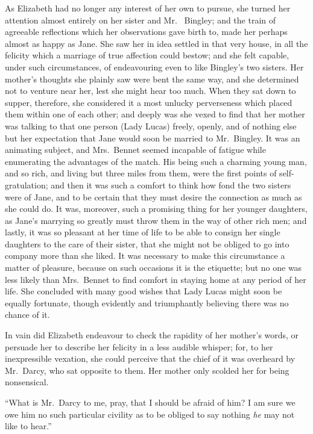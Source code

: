 As Elizabeth had no longer any interest of her own to pursue,
she turned her attention almost entirely on her sister and Mr.\ %
Bingley; and the train of agreeable reflections which her
observations gave birth to, made her perhaps almost as happy as
Jane.  She saw her in idea settled in that very house, in all the
felicity which a marriage of true affection could bestow; and she
felt capable, under such circumstances, of endeavouring even to
like Bingley's two sisters.  Her mother's thoughts she plainly
saw were bent the same way, and she determined not to venture
near her, lest she might hear too much.  When they sat down to
supper, therefore, she considered it a most unlucky perverseness
which placed them within one of each other; and deeply was she
vexed to find that her mother was talking to that one person
(Lady Lucas) freely, openly, and of nothing else but her
expectation that Jane would soon be married to Mr.\ Bingley.  It
was an animating subject, and Mrs.\ Bennet seemed incapable of
fatigue while enumerating the advantages of the match.  His
being such a charming young man, and so rich, and living but
three miles from them, were the first points of self-gratulation;
and then it was such a comfort to think how fond the two sisters
were of Jane, and to be certain that they must desire the
connection as much as she could do.  It was, moreover, such a
promising thing for her younger daughters, as Jane's marrying so
greatly must throw them in the way of other rich men; and lastly,
it was so pleasant at her time of life to be able to consign her
single daughters to the care of their sister, that she might not
be obliged to go into company more than she liked.  It was
necessary to make this circumstance a matter of pleasure,
because on such occasions it is the etiquette; but no one was less
likely than Mrs.\ Bennet to find comfort in staying home at any
period of her life.  She concluded with many good wishes that
Lady Lucas might soon be equally fortunate,  though evidently
and triumphantly believing there was no chance of it.

In vain did Elizabeth endeavour to check the rapidity of her
mother's words, or persuade her to describe her felicity in a
less audible whisper; for, to her inexpressible vexation, she
could perceive that the chief of it was overheard by Mr.\ Darcy,
who sat opposite to them.  Her mother only scolded her for
being nonsensical.

``What is Mr.\ Darcy to me, pray, that I should be afraid of him?
I am sure we owe him no such particular civility as to be obliged
to say nothing \emph{he} may not like to hear.''

